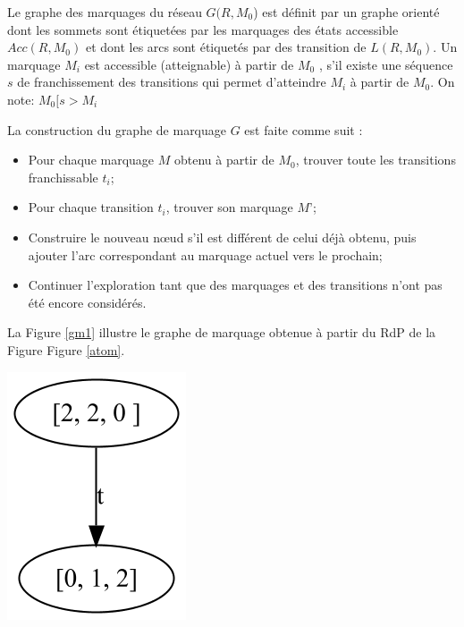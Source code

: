  
\begin{definition}
Le graphe des marquages du réseau $G(R, M_0 $) est définit par un graphe orienté dont les sommets sont étiquetées par les marquages des états accessible $Acc(R, M_0 )$ et dont les arcs sont étiquetés par des transition de $L(R, M_0 )$.
Un marquage $M_i$  est accessible (atteignable) à partir de $M_0$ , s'il existe une séquence $s$ de franchissement des transitions qui permet d'atteindre $M_i$  à partir de $M_0$. On note: $M_0  [s > M_i  $


La construction du graphe de marquage $G$ est faite comme suit \citep{SaidounicoursRdp2017}:
\begin{itemize}
	\item Pour chaque marquage $M$ obtenu à partir de $M_0$, trouver toute les transitions franchissable $t_i$;
	\item Pour chaque transition $t_i$, trouver son marquage $M’$;
	\item Construire le nouveau nœud s'il est différent de celui déjà obtenu, puis ajouter l'arc correspondant au marquage actuel vers le prochain;
	\item Continuer l'exploration tant que des marquages et des transitions n'ont pas été encore considérés.
\end{itemize}
La Figure \ref{gm1} illustre le graphe de marquage obtenue à partir du RdP de la Figure Figure \ref{atom}.
\begin{center}
	\includegraphics[scale=0.4]{img/gm1.PNG}
	 \label{gm1}
 \end{center}
\end{definition}

